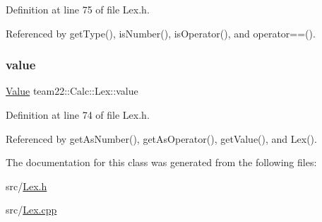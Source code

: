 Definition at line 75 of file Lex.\+h.



Referenced by get\+Type(), is\+Number(), is\+Operator(), and operator==().

\mbox{\label{classteam22_1_1_calc_1_1_lex_a8a78a736b719931cada0905ac13fedc8}} 
\subsubsection{\texorpdfstring{value}{value}}
{\footnotesize\ttfamily \hyperlink{unionteam22_1_1_calc_1_1_lex_1_1_value}{Value} team22\+::\+Calc\+::\+Lex\+::value\hspace{0.3cm}{\ttfamily [protected]}}



Definition at line 74 of file Lex.\+h.



Referenced by get\+As\+Number(), get\+As\+Operator(), get\+Value(), and Lex().



The documentation for this class was generated from the following files\+:\begin{DoxyCompactItemize}
\item 
src/\hyperlink{_lex_8h}{Lex.\+h}\item 
src/\hyperlink{_lex_8cpp}{Lex.\+cpp}\end{DoxyCompactItemize}
